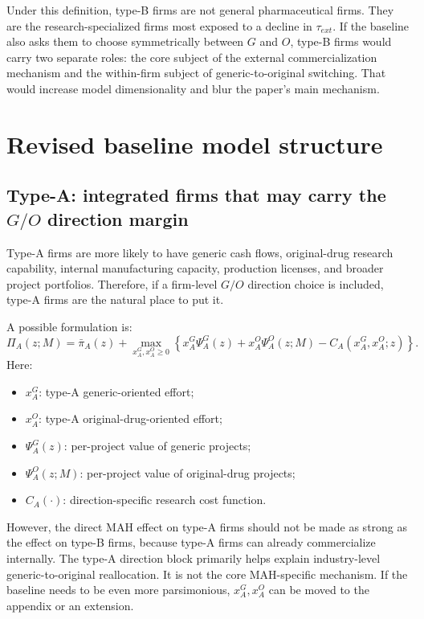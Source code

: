\documentclass[12pt]{article}
\begin{document}
Under this definition, type-B firms are not general pharmaceutical firms. They are the research-specialized firms most exposed to a decline in $\tau_{ext}$. If the baseline also asks them to choose symmetrically between $G$ and $O$, type-B firms would carry two separate roles: the core subject of the external commercialization mechanism and the within-firm subject of generic-to-original switching. That would increase model dimensionality and blur the paper's main mechanism.

\section{Revised baseline model structure}

\subsection{Type-A: integrated firms that may carry the $G/O$ direction margin}

Type-A firms are more likely to have generic cash flows, original-drug research capability, internal manufacturing capacity, production licenses, and broader project portfolios. Therefore, if a firm-level $G/O$ direction choice is included, type-A firms are the natural place to put it.

A possible formulation is:
\[
\Pi_A(z;M)
=
\bar{\pi}_A(z)
+
\max_{x_A^G,x_A^O\ge 0}
\left\{
x_A^G\Psi_A^G(z)
+
x_A^O\Psi_A^O(z;M)
-
C_A(x_A^G,x_A^O;z)
\right\}.
\]
Here:
\begin{itemize}
    \item $x_A^G$: type-A generic-oriented effort;
    \item $x_A^O$: type-A original-drug-oriented effort;
    \item $\Psi_A^G(z)$: per-project value of generic projects;
    \item $\Psi_A^O(z;M)$: per-project value of original-drug projects;
    \item $C_A(\cdot)$: direction-specific research cost function.
\end{itemize}

However, the direct MAH effect on type-A firms should not be made as strong as the effect on type-B firms, because type-A firms can already commercialize internally. The type-A direction block primarily helps explain industry-level generic-to-original reallocation. It is not the core MAH-specific mechanism. If the baseline needs to be even more parsimonious, $x_A^G,x_A^O$ can be moved to the appendix or an extension.
\end{document}

